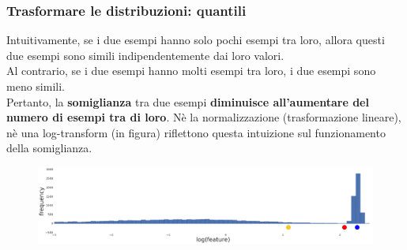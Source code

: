 \begin{frame}
	
	\frametitle{{\color{GradientDescentDiagramOrange}Trasformare le distribuzioni}: {\color{GradientDescentDiagramGreen}quantili}}
		
		Intuitivamente, se i due esempi hanno solo pochi esempi tra loro, allora questi due esempi sono simili indipendentemente dai loro valori.\\
		Al contrario, se i due esempi hanno molti esempi tra loro, i due esempi sono meno simili.\\
		Pertanto, la \textbf{somiglianza} tra due esempi \textbf{diminuisce all'aumentare del numero di esempi tra di loro}.
		\newlinedouble
		Nè la normalizzazione (trasformazione lineare), nè una log-transform (in figura) riflettono questa intuizione sul funzionamento della somiglianza.
		\begin{figure}[!htbp]
			\centering
			\includegraphics[width=12.0cm]{images/data_prep/scaling_distributions/LogTransform.png}
		\end{figure}
	
\end{frame}


